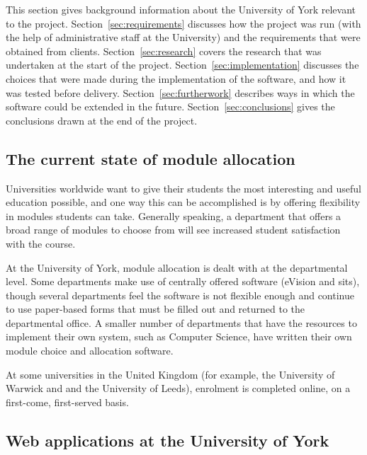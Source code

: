 \documentclass[draft]{scrartcl}
\begin{document}
This section gives background information about the University of York
relevant to the project. Section~\ref{sec:requirements} discusses how the
project was run (with the help of administrative staff at the University) and
the requirements that were obtained from clients. Section~\ref{sec:research}
covers the research that was undertaken at the start of the project.
Section~\ref{sec:implementation} discusses the choices that were made during
the implementation of the software, and how it was tested before delivery.
Section~\ref{sec:furtherwork} describes ways in which the software could be
extended in the future. Section~\ref{sec:conclusions} gives the conclusions
drawn at the end of the project.

\subsection{The current state of module allocation}


Universities worldwide want to give their students the most interesting and
useful education possible, and one way this can be accomplished is by offering
flexibility in modules students can take. Generally speaking, a department
that offers a broad range of modules to choose from will see increased student
satisfaction with the course.

At the University of York, module allocation is dealt with at the departmental
level. Some departments make use of centrally offered software (eVision and
\gls{sits}), though several departments feel the software is not flexible
enough and continue to use paper-based forms that must be filled out and
returned to the departmental office. A smaller number of departments that have
the resources to implement their own system, such as Computer Science, have
written their own module choice and allocation software.

At some universities in the United Kingdom (for example, the University of
Warwick and and the University of Leeds), enrolment is completed online, on a
first-come, first-served basis.


\subsection{Web applications at the University of York}
\end{document}
